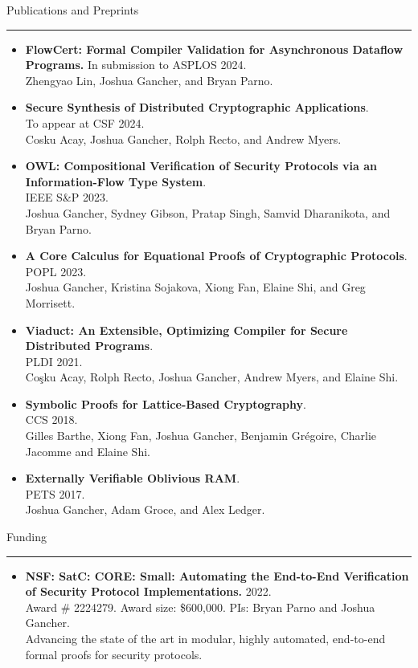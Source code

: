 \documentclass{article}
\newcommand{\rsection}[1]{\vspace{1em} {\huge #1} \vspace{0.5em} \hrule \vspace{1em}}
\begin{document}
\rsection{Publications and Preprints}
\begin{itemize}[leftmargin=*]
    \item {\bf FlowCert: Formal Compiler Validation for Asynchronous Dataflow Programs.}
        In submission to ASPLOS 2024. \\
         Zhengyao Lin, Joshua Gancher, and Bryan Parno.
    \item {\bf Secure Synthesis of Distributed Cryptographic Applications}. \\
        To appear at CSF 2024. \\ 
        Cosku Acay, Joshua Gancher, Rolph Recto, and Andrew Myers.
    \item {\bf OWL: Compositional Verification of Security Protocols
        via an Information-Flow Type System}. \\ IEEE S\&P 2023. \\
    Joshua Gancher, Sydney Gibson, Pratap Singh, Samvid Dharanikota, and Bryan
        Parno.
    \item {\bf A Core Calculus for Equational Proofs of Cryptographic
        Protocols}. \\ POPL 2023. \\ Joshua Gancher, Kristina Sojakova, Xiong Fan,
        Elaine Shi, and Greg Morrisett.  
    \item {\bf Viaduct: An Extensible, Optimizing Compiler for Secure
        Distributed Programs}. \\ PLDI 2021.
        \\
        Coşku Acay, Rolph Recto, Joshua Gancher, Andrew Myers, and Elaine Shi.
    \item \textbf{Symbolic Proofs for Lattice-Based Cryptography}. \\ CCS 2018. 
        \\
    {Gilles Barthe, Xiong Fan, Joshua Gancher, Benjamin Grégoire, Charlie Jacomme and Elaine Shi.}
    \item \textbf{Externally Verifiable Oblivious RAM}. \\ PETS 2017.
        \\
    Joshua Gancher, Adam Groce, and Alex Ledger.
\end{itemize}

\rsection{Funding}
 \begin{itemize}[leftmargin=*]
     \item {\bf NSF: SatC: CORE: Small: Automating the End-to-End Verification
         of Security Protocol Implementations.} 2022.
         \\
         Award \# 2224279. Award size: \$600,000. PIs: Bryan Parno and Joshua
         Gancher.
         \\
         Advancing the state of the art in modular, highly automated, end-to-end formal
         proofs for security protocols. 
 \end{itemize}
\end{document}
